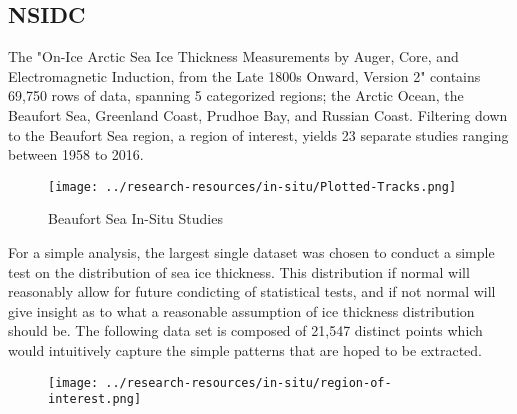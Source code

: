 \subsection*{NSIDC}
The "On-Ice Arctic Sea Ice Thickness Measurements by Auger, Core, and Electromagnetic Induction, from the Late 1800s Onward, Version 2" contains 69,750 rows of data, spanning 5 categorized regions; the Arctic Ocean, the Beaufort Sea, Greenland Coast, Prudhoe Bay, and Russian Coast. Filtering down to the Beaufort Sea region, a region of interest, yields 23 separate studies ranging between 1958 to 2016.
\begin{figure}[h]
	\centering
	\texttt{[image: ../research-resources/in-situ/Plotted-Tracks.png]}
	\caption{Beaufort Sea In-Situ Studies}
	\label{fig:bfsea-in-situ-agg}
\end{figure}

For a simple analysis, the largest single dataset was chosen to conduct a simple test on the distribution of sea ice thickness. This distribution if normal will reasonably allow for future condicting of statistical tests, and if not normal will give insight as to what a reasonable assumption of ice thickness distribution should be. The following data set is composed of 21,547 distinct points which would intuitively capture the simple patterns that are hoped to be extracted.

\begin{figure}[h]
	\centering
	\texttt{[image: ../research-resources/in-situ/region-of-interest.png]}
	\caption{}
	\label{fig:bfsea-in-situ-spec}
\end{figure}